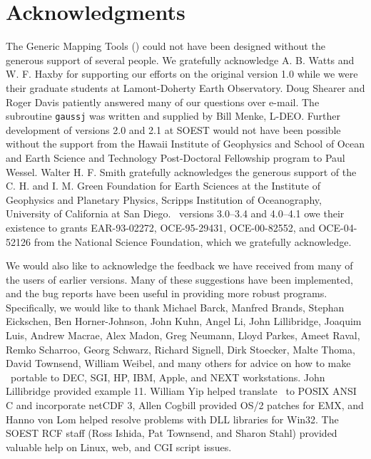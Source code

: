 %
%


\chapter*{Acknowledgments}

The Generic Mapping Tools (\GMT) could not have been designed without
the generous support of several people.  We gratefully acknowledge
A. B. Watts and W. F. Haxby for supporting our efforts on the original
version 1.0 while we were their graduate students at Lamont-Doherty
Earth Observatory.  Doug Shearer and Roger Davis patiently answered
many of our questions over e-mail.  The subroutine \texttt{gaussj} was
written and supplied by Bill Menke, L-DEO.
Further development of versions 2.0 and 2.1 at SOEST would not have
been possible without the support from the Hawaii Institute of
Geophysics and School of Ocean and Earth Science and Technology
Post-Doctoral Fellowship program to Paul Wessel.  Walter H. F. Smith
gratefully acknowledges the generous support of the C. H. and I. M.
Green Foundation for Earth Sciences at the Institute of Geophysics
and Planetary Physics, Scripps Institution of Oceanography, University
of California at San Diego.
\GMT\ versions 3.0--3.4 and 4.0--4.1 owe their existence to grants
EAR-93-02272, OCE-95-29431, OCE-00-82552, and OCE-04-52126
from the National Science Foundation, which we gratefully acknowledge.

We would also like to acknowledge the feedback we have received from many
of the users of earlier versions.  Many of these suggestions have
been implemented, and the bug reports have been useful in providing
more robust programs.  Specifically, we would like to thank
Michael Barck,
Manfred Brands,
Stephan Eickschen,
Ben Horner-Johnson,
John Kuhn,
Angel Li,
John Lillibridge,
Joaquim Luis,
Andrew Macrae,
Alex Madon,
Greg Neumann,
Lloyd Parkes,
Ameet Raval,
Remko Scharroo,
Georg Schwarz,
Richard Signell,
Dirk Stoecker,
Malte Thoma,
David Townsend,
William Weibel,
and many others for
advice on how to make \GMT\ portable to DEC, SGI, HP, IBM, Apple, and
NEXT workstations.  John Lillibridge provided example 11.  William
Yip helped translate \GMT\ to POSIX ANSI C and incorporate netCDF 3, 
Allen Cogbill provided OS/2 patches for EMX, and Hanno von Lom helped
resolve problems with DLL libraries for Win32.  The SOEST RCF staff
(Ross Ishida, Pat Townsend, and Sharon Stahl) provided valuable help
on Linux, web, and CGI script issues.

